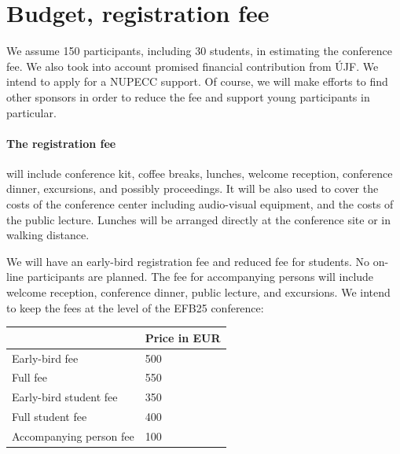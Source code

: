 \documentclass[12pt]{extarticle}
\begin{document}
\section*{Budget, registration fee}
\noindent
We assume 150 participants, including 30 students, in estimating the
conference fee. We also took into account promised financial
contribution from ÚJF. We intend to apply for a NUPECC support. Of
course, we will make efforts to find other sponsors in order to reduce
the fee and support young participants in particular.

\paragraph{The registration fee} will include conference kit, coffee
breaks, lunches, welcome reception, conference dinner, excursions, and
possibly proceedings. It will be also used to cover the costs of the
conference center including audio-visual equipment, and the costs of
the public lecture. Lunches will be arranged directly at the
conference site or in walking distance.

We will have an early-bird registration fee and reduced fee for
students. No on-line participants are planned. The fee for
accompanying persons will include welcome reception, conference
dinner, public lecture, and excursions. We intend to keep the fees at
the level of the EFB25 conference:

\smallskip
\begin{center}
  \begin{tabular}{ll}
    \hline %
    &   Price in EUR  \\[1mm]
    \hline %
    Early-bird fee & 500  \\[1mm]
    Full fee &  550 \\[1mm]
    Early-bird student fee & 350  \\[1mm]
    Full student fee &  400 \\[1mm]
    Accompanying person fee & 100  \\[1mm]
    \hline
  \end{tabular}
\end{center}


%
\end{document}
